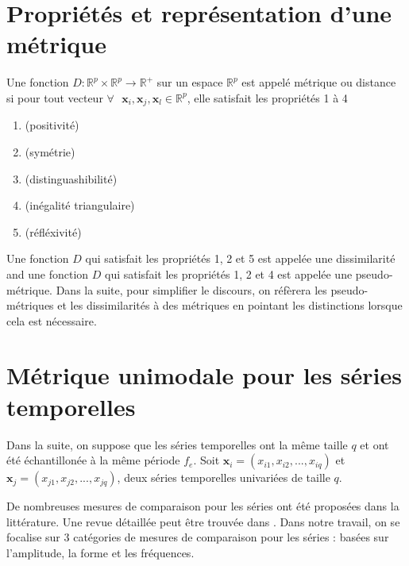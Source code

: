 \section*{Propriétés et représentation d'une métrique}
Une fonction $D:\mathbb{R}^p \times \mathbb{R}^p \rightarrow \mathbb{R}^+$ sur un espace $\mathbb{R}^p$ est appelé métrique ou distance si pour tout vecteur $\forall \textbf{ } \textbf{x}_i, \textbf{x}_j, \textbf{x}_l \in \mathbb{R}^p$, elle satisfait les propriétés 1 à 4 \cite{Deza2009}
\begin{enumerate}
	\item { (positivité)}
	\item { (symétrie)}	
	\item { (distinguashibilité)}
	\item { (inégalité triangulaire)}
	\item { (réfléxivité)}
\end{enumerate}
Une fonction $D$ qui satisfait les propriétés 1, 2 et 5 est appelée une dissimilarité and une fonction $D$ qui satisfait les propriétés 1, 2 et 4 est appelée une pseudo-métrique. Dans la suite, pour simplifier le discours, on réfèrera les pseudo-métriques et les dissimilarités à des métriques en pointant les distinctions lorsque cela est nécessaire. 

\section*{Métrique unimodale pour les séries temporelles}
Dans la suite, on suppose que les séries temporelles ont la même taille $q$ et ont été échantillonée à la même période $f_e$. Soit $\textbf{x}_i=(x_{i1}, x_{i2}, ..., x_{iq})$ et $\textbf{x}_j=(x_{j1}, x_{j2}, ..., x_{jq})$, deux séries temporelles univariées de taille $q$.

De nombreuses mesures de comparaison pour les séries ont été proposées dans la littérature. Une revue détaillée peut être trouvée dans \cite{Montero2014}. Dans notre travail, on se focalise sur 3 catégories de mesures de comparaison pour les séries : basées sur l'amplitude, la forme et les fréquences.

